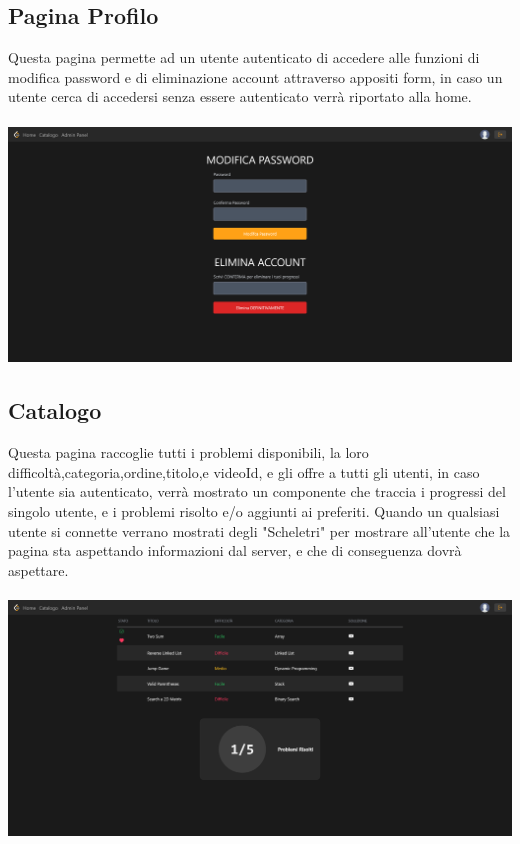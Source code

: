 \documentclass[11pt, a4paper]{article}
\theoremstyle{definition}
\begin{document}
\subsection{Pagina Profilo}
Questa pagina permette ad un utente autenticato di accedere alle funzioni di modifica password e di eliminazione account attraverso appositi form, in caso un utente cerca di accedersi senza essere autenticato verrà riportato alla home.\\\\
\includegraphics[width=\textwidth]{materiale/sito/Pagina Profilo.png}
\newpage
\subsection{Catalogo}
Questa pagina raccoglie tutti i problemi disponibili, la loro difficoltà,categoria,ordine,titolo,e videoId, e gli offre a tutti gli utenti, in caso l'utente sia autenticato, verrà mostrato un componente che traccia i progressi del singolo utente, e i problemi risolto e/o aggiunti ai preferiti.
Quando un qualsiasi utente si connette verrano mostrati degli "Scheletri" per mostrare all'utente che la pagina sta aspettando informazioni dal server, e che di conseguenza dovrà aspettare.\\\\
\includegraphics[width=\textwidth]{materiale/sito/Catalogo.png}
\newpage
\end{document}
